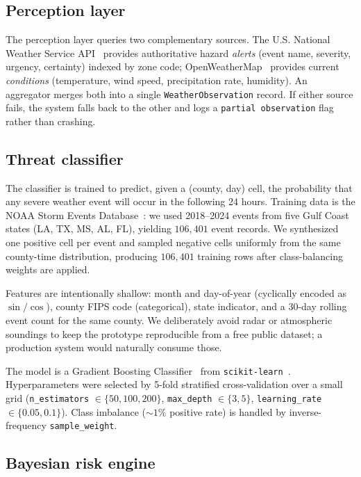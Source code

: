 \documentclass{article}
\theoremstyle{plain}
\theoremstyle{definition}
\theoremstyle{remark}
\begin{document}
\subsection{Perception layer}

The perception layer queries two complementary sources. The U.S.
National Weather Service API~\cite{nws_api} provides authoritative
hazard \emph{alerts} (event name, severity, urgency, certainty)
indexed by zone code; OpenWeatherMap~\cite{owm_api} provides current
\emph{conditions} (temperature, wind speed, precipitation rate,
humidity). An aggregator merges both into a single
\texttt{WeatherObservation} record. If either source fails, the system
falls back to the other and logs a \texttt{partial observation} flag
rather than crashing.

\subsection{Threat classifier}
\label{sec:classifier}

The classifier is trained to predict, given a (county, day) cell, the
probability that any severe weather event will occur in the
following 24 hours. Training data is the NOAA Storm Events
Database~\cite{noaa_storm_events}: we used 2018--2024 events from
five Gulf Coast states (LA, TX, MS, AL, FL), yielding $106{,}401$
event records. We synthesized one positive cell per event and
sampled negative cells uniformly from the same county-time
distribution, producing $106{,}401$ training rows after class-balancing
weights are applied.

Features are intentionally shallow: month and day-of-year (cyclically
encoded as $\sin/\cos$), county FIPS code (categorical), state
indicator, and a 30-day rolling event count for the same county. We
deliberately avoid radar or atmospheric soundings to keep the
prototype reproducible from a free public dataset; a production system
would naturally consume those.

The model is a Gradient Boosting
Classifier~\cite{friedman2001greedy} from
\texttt{scikit-learn}~\cite{pedregosa2011scikit}. Hyperparameters were
selected by 5-fold stratified cross-validation over a small grid
(\texttt{n\_estimators} $\in \{50,100,200\}$, \texttt{max\_depth} $\in
\{3,5\}$, \texttt{learning\_rate} $\in \{0.05,0.1\}$). Class imbalance
($\sim 1\%$ positive rate) is handled by inverse-frequency
\texttt{sample\_weight}.

\subsection{Bayesian risk engine}
\label{sec:bayes}
\end{document}
